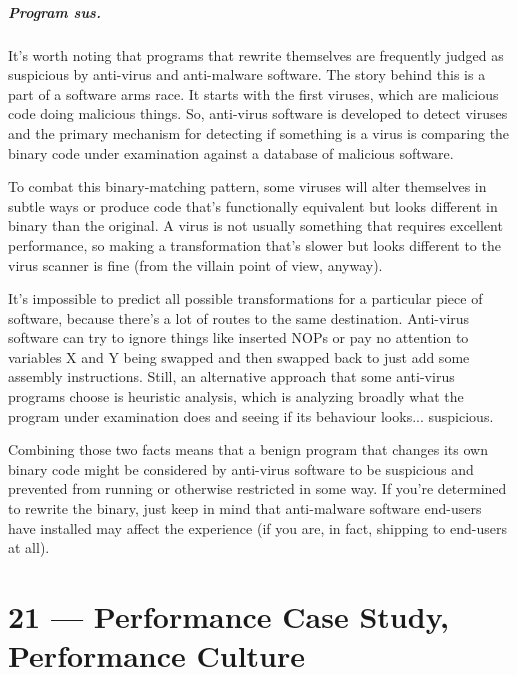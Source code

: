 \documentclass[a4paper]{report}
\begin{document}
\paragraph{Program sus.}
It's worth noting that programs that rewrite themselves are frequently judged as suspicious by anti-virus and anti-malware software. The story behind this is a part of a software arms race. It starts with the first viruses, which are malicious code doing malicious things. So, anti-virus software is developed to detect viruses and the primary mechanism for detecting if something is a virus is comparing the binary code under examination against a database of malicious software.

To combat this binary-matching pattern, some viruses will alter themselves in subtle ways or produce code that's functionally equivalent but looks different in binary than the original. A virus is not usually something that requires excellent performance, so making a transformation that's slower but looks different to the virus scanner is fine (from the villain point of view, anyway).

It's impossible to predict all possible transformations for a particular piece of software, because there's a lot of routes to the same destination. Anti-virus software can try to ignore things like inserted NOPs or pay no attention to variables X and Y being swapped and then swapped back to just add some assembly instructions. Still, an alternative approach that some anti-virus programs choose is heuristic analysis, which is analyzing broadly what the program under examination does and seeing if its behaviour looks... suspicious.

Combining those two facts means that a benign program that changes its own binary code might be considered by anti-virus software to be suspicious and prevented from running or otherwise restricted in some way. If you're determined to rewrite the binary, just keep in mind that anti-malware software end-users have installed may affect the experience (if you are, in fact, shipping to end-users at all).








\chapter*{21 --- Performance Case Study, Performance Culture}

\end{document}
